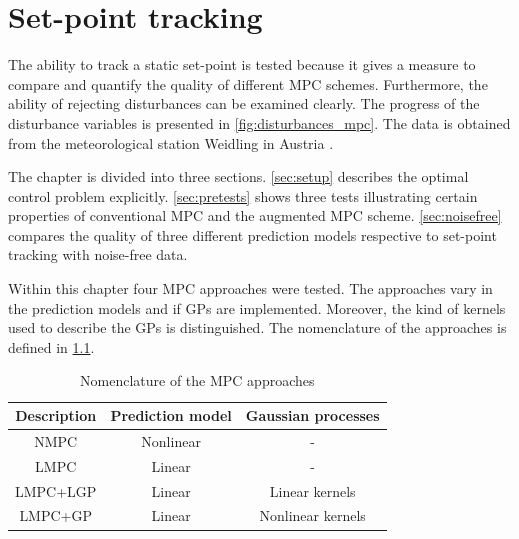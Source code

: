 \chapter{Set-point tracking}
\label{cha:setpoint}
The ability to track a static set-point is tested because it gives a measure to compare and quantify the quality of different MPC schemes.
Furthermore, the ability of rejecting disturbances can be examined clearly.
The progress of the disturbance variables is presented in \cref{fig:disturbances_mpc}.
The data is obtained from the meteorological station Weidling in Austria \cite{Unfried.2016}.

The chapter is divided into three sections.
\cref{sec:setup} describes the optimal control problem explicitly.
\cref{sec:pretests} shows three tests illustrating certain properties of conventional MPC and the augmented MPC scheme.
\cref{sec:noisefree} compares the quality of three different prediction models respective to set-point tracking with noise-free data.

Within this chapter four MPC approaches were tested.
The approaches vary in the prediction models and if GPs are implemented.
Moreover, the kind of kernels used to describe the GPs is distinguished.
The nomenclature of the approaches is defined in \cref{tab:nomenclature_MPC}.

\begin{table}[b]
	\centering
		\begin{tabular}{ccc}
		Description   &  Prediction model     &  Gaussian processes                  \\\midrule
		NMPC          &  Nonlinear            &       -                              \\
		LMPC          &  Linear               &       -                              \\
		LMPC+LGP      &  Linear               &  Linear kernels                      \\
		LMPC+GP       &  Linear               &  Nonlinear kernels                   \\\bottomrule
		\end{tabular}
		\vspace{1mm}
	\caption{Nomenclature of the MPC approaches}
	\label{tab:nomenclature_MPC}
\end{table}

